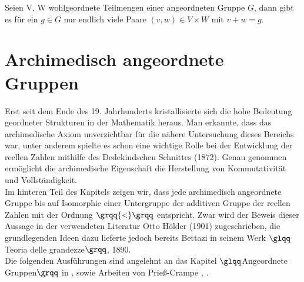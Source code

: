 \begin{folg}\label{FolgerungNeumann} %
Seien V, W wohlgeordnete Teilmengen einer angeordneten Gruppe $G$, dann gibt es für ein $g \in G$ nur endlich viele Paare $\left(v, w\right) \in V\times W$ mit $v + w = g$.
\end{folg}

\section{Archimedisch angeordnete Gruppen}\label{Archimedisch angeordnete Gruppen}
%
Erst seit dem Ende des 19. Jahrhunderts kristallisierte sich die hohe Bedeutung geordneter Strukturen in der Mathematik heraus. Man erkannte, dass das archimedische Axiom unverzichtbar für die nähere Untersuchung dieses Bereichs war, unter anderem spielte es schon eine wichtige Rolle bei der Entwicklung der reellen Zahlen mithilfe des Dedekindschen Schnittes (1872). Genau genommen ermöglicht die archimedische Eigenschaft die Herstellung von Kommutativität und Vollständigkeit. \\ %
Im hinteren Teil des Kapitels zeigen wir, dass jede archimedisch angeordnete Gruppe bis auf Isomorphie einer Untergruppe der additiven Gruppe der reellen Zahlen mit der Ordnung $\grqq{<}\grqq$ entspricht. Zwar wird der Beweis dieser Aussage in der verwendeten Literatur Otto Hölder (1901)\cite{hoelder1901} zugeschrieben, die grundlegenden Ideen dazu lieferte jedoch bereits Bettazi in seinem Werk $\glqq$Teoria delle grandezze$\grqq$, 1890.\cite[S. 578]{Lueneburg08}\\ 
Die folgenden Ausführungen sind angelehnt an das Kapitel $\glqq$Angeordnete Gruppen$\grqq$ in \cite[S. 73 - 93]{fuchs66}, sowie Arbeiten von Prieß-Crampe \cite{priesscrampe69}, \cite{priesscrampe83}.

